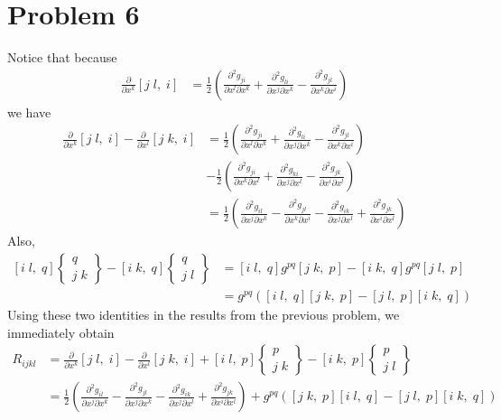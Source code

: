 \documentclass[12pt]{article}
\newcommand{\eq}[1]{\begin{align*}#1\end{align*}}
\newcommand{\p}[2]{\frac{\partial#1}{\partial#2}}
\newcommand{\pp}[3]{\frac{\partial^2#1}{\partial#2\partial#3}}
\newcommand{\crsf}[3]{\left[#1\;#2,\;#3\right]}
\newcommand{\crss}[3]{\left\{\begin{array}{c}#1\\#2\;#3\end{array}\right\}}
\begin{document}
\section*{Problem 6}
Notice that because
\eq{
	\p{}{x^k}\crsf{j}{l}{i} &= \frac{1}{2}\left(\pp{g_{ji}}{x^l}{x^k} + \pp{g_{li}}{x^j}{x^k} - \pp{g_{jl}}{x^k}{x^i}\right)
}
we have
\eq{
	\p{}{x^k}\crsf{j}{l}{i} - \p{}{x^l}\crsf{j}{k}{i} &= \frac{1}{2}\left(\pp{g_{ji}}{x^l}{x^k} + \pp{g_{li}}{x^j}{x^k} - \pp{g_{jl}}{x^k}{x^i}\right)\\
	&- \frac{1}{2}\left(\pp{g_{ji}}{x^k}{x^l} + \pp{g_{ki}}{x^j}{x^l} - \pp{g_{jk}}{x^i}{x^l}\right)\\
	&= \frac{1}{2}\left(\pp{g_{il}}{x^j}{x^k} - \pp{g_{jl}}{x^k}{x^i} - \pp{g_{ik}}{x^j}{x^l} + \pp{g_{jk}}{x^i}{x^l}\right)
}
Also,
\eq{
	\crsf{i}{l}{q}\crss{q}{j}{k} - \crsf{i}{k}{q}\crss{q}{j}{l} &= \crsf{i}{l}{q}g^{pq}\crsf{j}{k}{p} - \crsf{i}{k}{q}g^{pq}\crsf{j}{l}{p}\\
	&= g^{pq}(\crsf{i}{l}{q}\crsf{j}{k}{p} - \crsf{j}{l}{p}\crsf{i}{k}{q})
}
Using these two identities in the results from the previous problem, we immediately obtain
\eq{
	R_{ijkl} &= \p{}{x^k}\crsf{j}{l}{i} - \p{}{x^l}\crsf{j}{k}{i} + \crsf{i}{l}{p}\crss{p}{j}{k} - \crsf{i}{k}{p}\crss{p}{j}{l}\\
	&= \frac{1}{2}\left(\pp{g_{il}}{x^j}{x^k} - \pp{g_{jl}}{x^j}{x^k} - \pp{g_{ik}}{x^j}{x^l} + \pp{g_{jk}}{x^i}{x^l}\right) + g^{pq}(\crsf{j}{k}{p}\crsf{i}{l}{q} - \crsf{j}{l}{p}\crsf{i}{k}{q})
}
\end{document}
